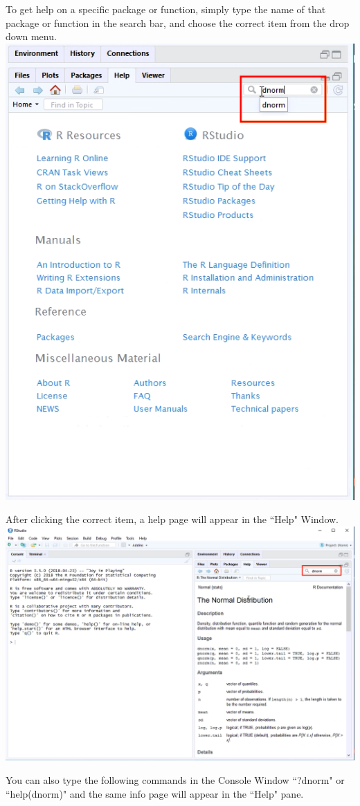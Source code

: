 \documentclass[a4paper]{report}
\begin{document}
\begin{flushleft}
        To get help on a specific package or function, simply type the name of that package or function in the search bar, and choose the correct item from the drop down menu. 
        \includegraphics[width=\textwidth]{images/GH3.png}
        
       \newpage  After clicking the correct item, a help page will appear in the ``Help" Window. 
        \includegraphics[width=\textwidth]{images/GH2.png}

        You can also type the following commands in the Console Window ``?dnorm" or ``help(dnorm)" and the same info page will appear in the ``Help" pane. 
        \end{flushleft}
        
\end{document}
